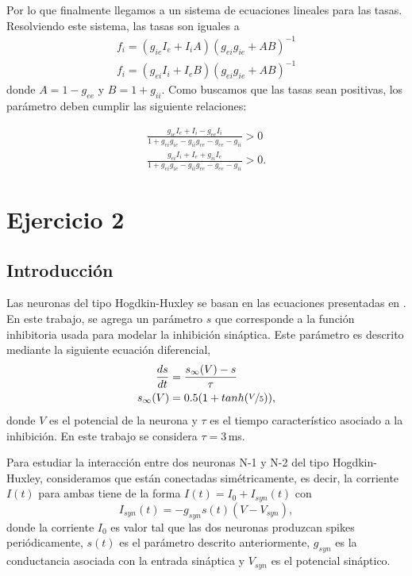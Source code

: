 Por lo que finalmente llegamos a un sistema de ecuaciones lineales para las tasas. Resolviendo este sistema, las tasas son iguales a 
\begin{align}
     f_i = (g_{ie}I_e + I_iA)(g_{ei}g_{ie}+ AB)^{-1}\\
     f_i = (g_{ei}I_i + I_eB)(g_{ei}g_{ie}+ AB)^{-1} 
\end{align}
donde $A= 1 - g_{ee}$ y $B=1+g_{ii}$. Como buscamos que las tasas sean positivas, los parámetro deben cumplir las siguiente relaciones: 

\begin{align}
     \frac{g_{ie}I_e + I_i -g_{ee}I_i }{1+g_{ei}g_{ie} - g_{ii}g_{ee} -g_{ee}-g_{ii}} > 0\\
     \frac{g_{ei}I_i + I_e +g_{ii}I_e }{1+g_{ei}g_{ie} - g_{ii}g_{ee} -g_{ee}-g_{ii}} > 0 .
\end{align}


\section*{Ejercicio 2}

\subsection{Introducción}

Las neuronas del tipo Hogdkin-Huxley se basan en las ecuaciones presentadas en \cite{HH}. En este trabajo, se agrega un parámetro $s$ que corresponde a la función inhibitoria \cite{syn} usada para modelar la inhibición sináptica. Este parámetro es descrito mediante la siguiente ecuación diferencial,
\begin{align}
    \frac{ds}{dt}&= \frac{s_\infty(V) - s}{\tau}\\
    s_\infty(V)&= 0.5(1+tanh(\nicefrac{V}{5})),
\end{align}
donde $V$ es el potencial de  la neurona y $\tau$ es el tiempo característico asociado a la inhibición. En este trabajo se considera  $\tau = 3\,$ms.

Para estudiar la interacción entre dos neuronas N-1 y N-2 del tipo Hogdkin-Huxley, consideramos que están conectadas simétricamente, es decir, la corriente $I(t)$ para ambas tiene de la forma
$I(t) = I_0 + I_{syn}(t) $ con 
\begin{equation}
     I_{syn}(t)      = -g_{syn}s(t)(V-V_{syn}),
 \end{equation} 
donde la corriente $I_0$ es valor tal que las dos neuronas produzcan spikes periódicamente, $s(t)$ es el parámetro descrito anteriormente, $g_{syn}$ es la conductancia asociada con la entrada sináptica y $V_{syn}$ es el potencial sináptico.

